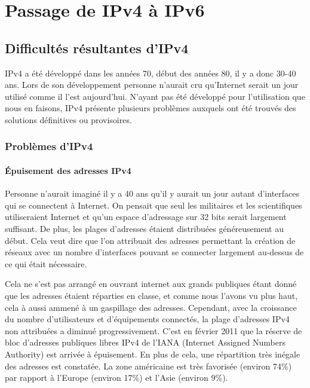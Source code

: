 \section{Passage de IPv4 à IPv6}
\label{sec:passage-IP4-IP6}

\subsection{Difficultés résultantes d'IPv4}
IPv4 a été développé dans les années 70, début des années 80, il y a donc 30-40
ans.  Lors de son développement personne n'aurait cru qu'Internet serait un
jour utilisé comme il l'est aujourd'hui. N'ayant pas été développé pour
l'utilisation que nous en faisons, IPv4 présente plusieurs problèmes auxquels
ont été trouvés des solutions définitives ou provisoires.

\subsubsection{Problèmes d'IPv4}

\paragraph{Épuisement des adresses IPv4}

Personne n'aurait imaginé il y a 40 ans qu'il y aurait un jour autant
d'interfaces qui se connectent à Internet. On pensait que seul les militaires
et les scientifiques utiliseraient Internet et qu'un espace d'adressage sur 32
bits serait largement suffisant.  De plus, les plages d'adresses étaient
distribuées généreusement au début.  Cela veut dire que l'on attribuait des
adresses permettant la création de réseaux avec un nombre d'interfaces pouvant
se connecter largement au-dessus de ce qui était nécessaire.

Cela ne s'est pas arrangé en ouvrant internet aux grands publiques étant donné
que les adresses étaient réparties en classe, et comme nous l'avons vu plus
haut, cela à aussi ammené à un gaspillage des adresses.  Cependant, avec la
croissance du nombre d'utilisateurs et d'équipements connectés, la plage
d'adresses IPv4 non attribuées a diminué progressivement. C'est en février 2011
que la réserve de bloc d'adresses publiques libres IPv4 de l'IANA (Internet
Assigned Numbers Authority) est arrivée à épuisement. En plus de cela, une
répartition très inégale des adresses est constatée.  La zone américaine est
très favorisée (environ 74\%) par rapport à l'Europe (environ 17\%) et l'Asie
(environ 9\%).



